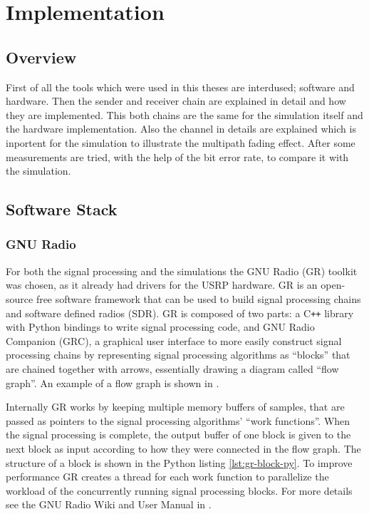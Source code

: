 
\chapter{Implementation}

\section{Overview}

First of all the tools which were used in this theses are interdused; software and hardware. Then the sender and receiver chain are explained in detail and how they are implemented. This both chains are the same for the simulation itself and the hardware implementation. Also the channel in details are explained which is inportent for the simulation to illustrate the multipath fading effect. After some measurements are tried, with the help of the bit error rate, to compare it with the simulation.

\section{Software Stack}

\subsection{GNU Radio}
For both the signal processing and the simulations the GNU Radio (GR) toolkit was chosen, as it already had drivers for the USRP hardware. GR is an open-source free software framework that can be used to build signal processing chains and software defined radios (SDR). GR is composed of two parts: a C\texttt{++} library with Python bindings to write signal processing code, and GNU Radio Companion (GRC), a graphical user interface to more easily construct signal processing chains by representing signal processing algorithms as ``blocks'' that are chained together with arrows, essentially drawing a diagram called ``flow graph''. An example of a flow graph is shown in .

Internally GR works by keeping multiple memory buffers of samples, that are passed as pointers to the signal processing algorithms' ``work functions''. When the signal processing is complete, the output buffer of one block is given to the next block as input according to how they were connected in the flow graph. The structure of a block is shown in the Python listing \ref{lst:gr-block-py}. To improve performance GR creates a thread for each work function to parallelize the workload of the concurrently running signal processing blocks. For more details see the GNU Radio Wiki and User Manual in \cite{GRWiki}.

